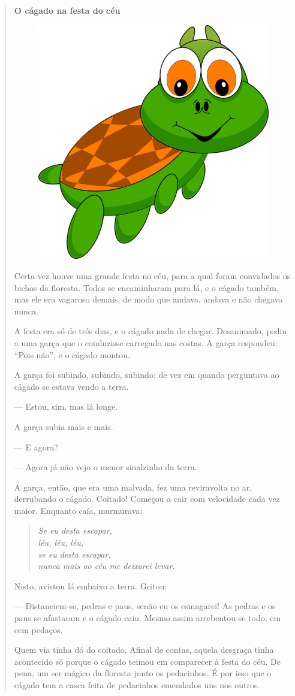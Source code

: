 \begin{quote}
\textbf{O cágado na festa do céu}

\begin{figure}
\includegraphics[width=.5\textwidth]{./media/image19.png}
\end{figure}

Certa vez houve uma grande festa no céu, para a qual foram convidados os
bichos da floresta. Todos se encaminharam para lá, e o cágado também, mas
ele era vagaroso demais, de modo que andava, andava e não chegava
nunca.

A festa era só de três dias, e o cágado nada de chegar. Desanimado, pediu
a uma garça que o conduzisse carregado nas costas. A garça respondeu: ``Pois não'', e
o cágado montou.

A garça foi subindo, subindo, subindo; de vez em quando perguntava ao
cágado se estava vendo a terra.

--- Estou, sim, mas lá longe.

A garça subia mais e mais.

--- E agora?

--- Agora já não vejo o menor sinalzinho da terra.

A garça, então, que era uma malvada, fez uma reviravolta no ar,
derrubando o cágado. Coitado! Começou a cair com velocidade cada vez
maior. Enquanto caía, murmurava:

\begin{verse}
\emph{Se eu desta escapar,}\\
\emph{léu, léu, léu,}\\
\emph{se eu desta escapar,}\\
\emph{nunca mais ao céu me deixarei levar.}
\end{verse}

Nisto, avistou lá embaixo a terra. Gritou:

--- Distanciem-se, pedras e paus, senão eu os esmagarei! As pedras e os paus
se afastaram e o cágado caiu. Mesmo assim arrebentou-se todo, em cem
pedaços.

Quem via tinha dó do coitado. Afinal de contas, aquela
desgraça tinha acontecido só porque o cágado teimou em comparecer à festa do
céu. De pena, um ser mágico da floresta junto os pedacinhos.
É por isso que o cágado tem a casca feita de pedacinhos emendados uns
nos outros.

\end{quote}

